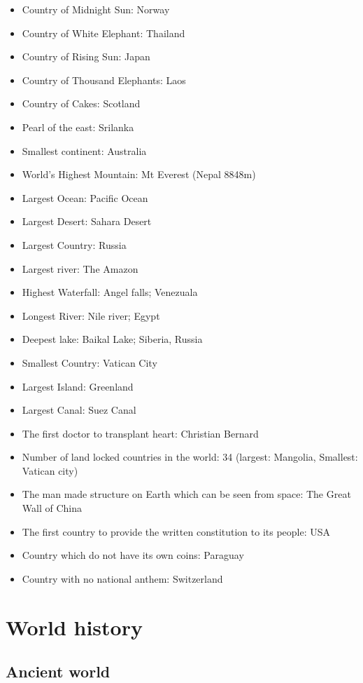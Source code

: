\documentclass[
  openany]{book}
\begin{document}
\begin{itemize}
\item
  Country of Midnight Sun: Norway
\item
  Country of White Elephant: Thailand
\item
  Country of Rising Sun: Japan
\item
  Country of Thousand Elephants: Laos
\item
  Country of Cakes: Scotland
\item
  Pearl of the east: Srilanka
\item
  Smallest continent: Australia
\item
  World's Highest Mountain: Mt Everest (Nepal 8848m)
\item
  Largest Ocean: Pacific Ocean
\item
  Largest Desert: Sahara Desert
\item
  Largest Country: Russia
\item
  Largest river: The Amazon
\item
  Highest Waterfall: Angel falls; Venezuala
\item
  Longest River: Nile river; Egypt
\item
  Deepest lake: Baikal Lake; Siberia, Russia
\item
  Smallest Country: Vatican City
\item
  Largest Island: Greenland
\item
  Largest Canal: Suez Canal
\item
  The first doctor to transplant heart: Christian Bernard
\item
  Number of land locked countries in the world: 34 (largest: Mangolia, Smallest: Vatican city)
\item
  The man made structure on Earth which can be seen from space: The Great Wall of China
\item
  The first country to provide the written constitution to its people: USA
\item
  Country which do not have its own coins: Paraguay
\item
  Country with no national anthem: Switzerland
\end{itemize}

\hypertarget{world-history}{%
\chapter{World history}\label{world-history}}

\hypertarget{ancient-world}{%
\section{Ancient world}\label{ancient-world}}
\end{document}
